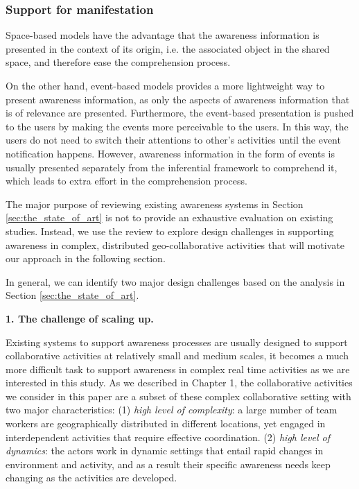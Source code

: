 
\subsubsection{Support for manifestation} %
\label{ssub:support_for_manifestation}



Space-based models have the advantage that the awareness information is presented in the context of its origin, i.e. the associated object in the shared space, and therefore ease the comprehension process. 

On the other hand, event-based models provides a more lightweight way to present awareness information, as only the aspects of awareness information that is of relevance are presented. Furthermore, the event-based presentation is pushed to the users by making the events more perceivable to the users. In this way, the users do not need to switch their attentions to other’s activities until the event notification happens. However, awareness information in the form of events is usually presented separately from the inferential framework to comprehend it, which leads to extra effort in the comprehension process.

The major purpose of reviewing existing awareness systems in Section \ref{sec:the_state_of_art} is not to provide an exhaustive evaluation on existing studies. Instead, we use the review to explore design challenges in supporting awareness in complex, distributed geo-collaborative activities that will motivate our approach in the following section. 

In general, we can identify two major design challenges based on the analysis in Section \ref{sec:the_state_of_art}.

\textbf{1. The challenge of scaling up.}

Existing systems to support awareness processes are usually designed to support collaborative activities at relatively small and medium scales, it becomes a much more difficult task to support awareness in complex real time activities as we are interested in this study. As we described in Chapter 1, the collaborative activities we consider in this paper are a subset of these complex collaborative setting with two major characteristics: (1) \emph{high level of complexity}: a large number of team workers are geographically distributed in different locations, yet engaged in interdependent activities that require effective coordination. (2) \emph{high level of dynamics}: the actors work in dynamic settings that entail rapid changes in environment and activity, and as a result their specific awareness needs keep changing as the activities are developed.

